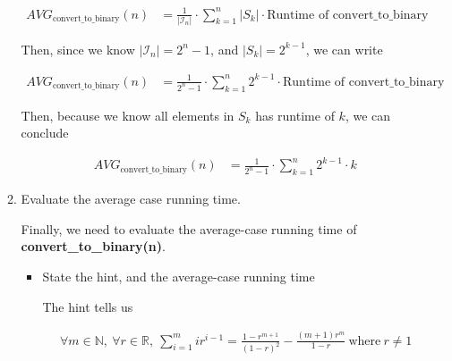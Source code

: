 \documentclass[12pt]{article}
\begin{document}
\begin{enumerate}[a.]
\begin{mdframed}
\begin{enumerate}[1.]
\begin{mdframed}
            \begin{align}
                AVG_{\text{convert\_to\_binary}}(n) &= \frac{1}{\lvert \mathcal{I}_n \rvert} \cdot \sum\limits_{k = 1}^n \lvert S_k \rvert \cdot \text{Runtime of convert\_to\_binary}
            \end{align}

            \bigskip

            Then, since we know $\lvert \mathcal{I}_n \rvert = 2^n - 1$, and
            $\lvert S_k \rvert = 2^{k-1}$, we can write

            \begin{align}
                AVG_{\text{convert\_to\_binary}}(n) &= \frac{1}{2^n - 1} \cdot \sum\limits_{k = 1}^n 2^{k-1} \cdot \text{Runtime of convert\_to\_binary}
            \end{align}

            \bigskip

            Then, because we know all elements in $S_k$ has runtime of $k$,
            we can conclude

            \begin{align}
                AVG_{\text{convert\_to\_binary}}(n) &= \frac{1}{2^n - 1} \cdot \sum\limits_{k = 1}^n 2^{k-1} \cdot k
            \end{align}

        \end{mdframed}

        \item Evaluate the average case running time.

        \bigskip

        Finally, we need to evaluate the average-case running time of
        \textbf{convert\_to\_binary(n)}.

        \bigskip

        \begin{itemize}
            \item State the hint, and the average-case running time

            \begin{mdframed}

            The hint tells us

            \begin{align}
                \forall m \in \mathbb{N},\:\forall r \in \mathbb{R},\:\sum\limits_{i=1}^m ir^{i-1} = \frac{1 - r^{m+1}}{(1-r)^2} - \frac{(m+1)r^m}{1-r}\:\text{where}\:r \neq 1
            \end{align}


\end{mdframed}
\end{itemize}
\end{enumerate}
\end{mdframed}
\end{enumerate}
\end{document}

